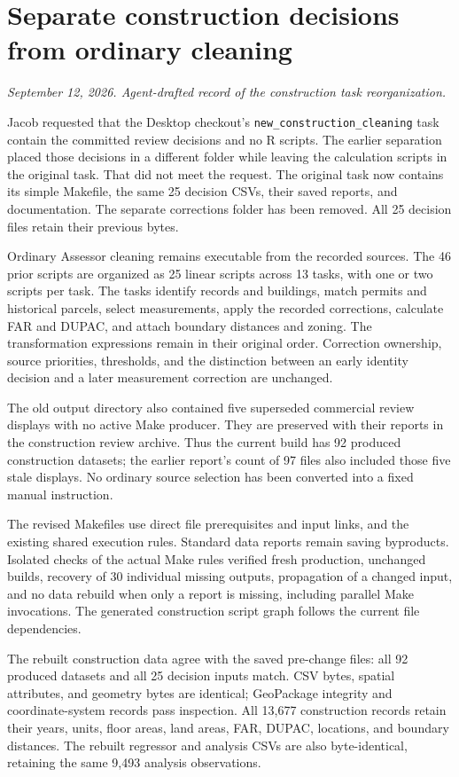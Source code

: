 \section*{Separate construction decisions from ordinary cleaning}
\textit{September 12, 2026. Agent-drafted record of the construction task reorganization.}

Jacob requested that the Desktop checkout's \texttt{new\_construction\_cleaning}
task contain the committed review decisions and no R scripts. The earlier
separation placed those decisions in a different folder while leaving the
calculation scripts in the original task. That did not meet the request. The
original task now contains its simple Makefile, the same 25 decision CSVs,
their saved reports, and documentation. The separate corrections folder has
been removed. All 25 decision files retain their previous bytes.

Ordinary Assessor cleaning remains executable from the recorded sources.
The 46 prior scripts are organized as 25 linear scripts across 13 tasks,
with one or two scripts per task. The tasks identify records and buildings,
match permits and historical parcels, select measurements, apply the recorded
corrections, calculate FAR and DUPAC, and attach boundary distances and zoning.
The transformation expressions remain in their original order. Correction
ownership, source priorities, thresholds, and the distinction between an early
identity decision and a later measurement correction are unchanged.

The old output directory also contained five superseded commercial review
displays with no active Make producer. They are preserved with their reports
in the construction review archive. Thus the current build has 92 produced
construction datasets; the earlier report's count of 97 files also included
those five stale displays. No ordinary source selection has been converted
into a fixed manual instruction.

The revised Makefiles use direct file prerequisites and input links, and the
existing shared execution rules. Standard data reports remain saving
byproducts. Isolated checks of the actual Make rules verified fresh production,
unchanged builds, recovery of 30 individual missing outputs, propagation of a
changed input, and no data rebuild when only a report is missing, including
parallel Make invocations. The generated construction script graph follows
the current file dependencies.

The rebuilt construction data agree with the saved pre-change files: all 92
produced datasets and all 25 decision inputs match. CSV bytes, spatial
attributes, and geometry bytes are identical; GeoPackage integrity and
coordinate-system records pass inspection. All 13,677 construction records
retain their years, units, floor areas, land areas, FAR, DUPAC, locations, and
boundary distances. The rebuilt regressor and analysis CSVs are also
byte-identical, retaining the same 9,493 analysis observations.

